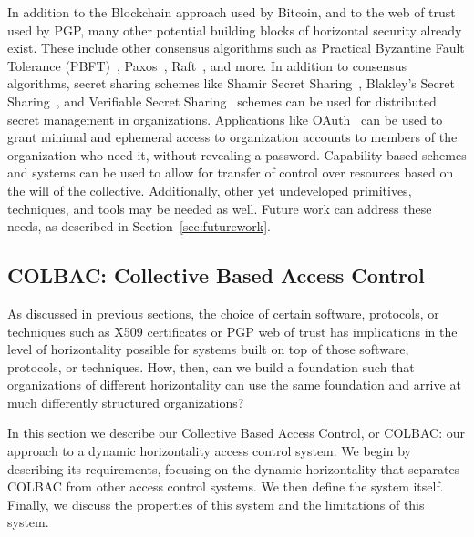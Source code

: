 In addition to the Blockchain approach used by Bitcoin, and to the web of trust
used by PGP, many other potential building blocks of horizontal security already
exist. These include other consensus algorithms such as Practical Byzantine
Fault Tolerance (PBFT)~\cite{castro1999practical}, Paxos~\cite{lamport2019part}, 
Raft~\cite{ongaro2013search}, and more. In addition to consensus algorithms,
secret sharing schemes like Shamir Secret Sharing~\cite{shamir1979share}, 
Blakley's Secret Sharing~\cite{blakley1993linear}, and Verifiable Secret 
Sharing~\cite{chor1985verifiable} schemes can be used for distributed secret
management in organizations. Applications like OAuth~\cite{leiba2012oauth} can
be used to grant minimal and ephemeral access to organization accounts to
members of the organization who need it, without revealing a password. 
Capability based schemes and systems can be used to allow for transfer of
control over resources based on the will of the collective. Additionally, other
yet undeveloped primitives, techniques, and tools may be needed as well. Future
work can address these needs, as described in Section~\ref{sec:futurework}.

\subsection{COLBAC: Collective Based Access Control}
\label{sec:colbac}
As discussed in previous sections, the choice of certain software, protocols, or
techniques such as X509 certificates or PGP web of trust has implications in the
level of horizontality possible for systems built on top of those software,
protocols, or techniques. How, then, can we build a foundation such that
organizations of different horizontality can use the same foundation and arrive
at much differently structured organizations?

In this section we describe our Collective Based Access Control, or COLBAC: our
approach to a dynamic horizontality access control system. We begin by
describing its requirements, focusing on the dynamic horizontality that
separates COLBAC from other access control systems. We then define the system
itself. Finally, we discuss the properties of this system and the limitations of
this system.


